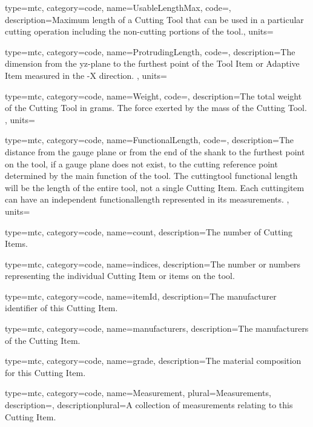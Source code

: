{
  type=mtc,
  category=code,
  name={UsableLengthMax},
  code=,
  description={Maximum length of a Cutting Tool that can be used in a particular cutting operation including the non-cutting portions of the tool.},
  units=
}


{
  type=mtc,
  category=code,
  name={ProtrudingLength},
  code=,
  description={The dimension from the yz-plane to the furthest point of the Tool Item or Adaptive Item measured in the -X direction. },
  units=
}


{
  type=mtc,
  category=code,
  name={Weight},
  code=,
  description={The total weight of the Cutting Tool in grams. The force exerted by the mass of the Cutting Tool. },
  units=
}


{
  type=mtc,
  category=code,
  name={FunctionalLength},
  code=,
  description={The distance from the gauge plane or from the end of the shank to the furthest point on the tool, if a gauge plane does not exist, to the cutting reference point determined by the main function of the tool. The \gls{cuttingtool} functional length will be the length of the entire tool, not a single Cutting Item. Each \gls{cuttingitem} can have an independent \gls{functionallength} represented in its measurements. },
  units=
}


{
  type=mtc,
  category=code,
  name={count},
  description={The number of Cutting Items. }
}


{
  type=mtc,
  category=code,
  name={indices},
  description={The number or numbers representing the individual Cutting Item or items on the tool. }
}


{
  type=mtc,
  category=code,
  name={itemId},
  description={The manufacturer identifier of this Cutting Item. }
}


{
  type=mtc,
  category=code,
  name={manufacturers},
  description={The manufacturers of the Cutting Item. }
}


{
  type=mtc,
  category=code,
  name={grade},
  description={The material composition for this Cutting Item.}
}


{
  type=mtc,
  category=code,
  name={Measurement},
  plural={Measurements},
  description={},
  descriptionplural={A collection of measurements relating to this Cutting Item.}
}


